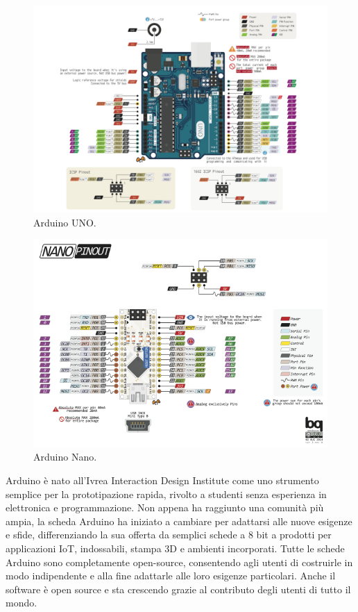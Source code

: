\documentclass[12pt,oneside,a4paper]{article}
\begin{document}
\clearpage
\begin{figure}[!htb]
    \centering
    \includegraphics[width=0.90\linewidth]{figures/arduinoUNO.png}
    \caption{Arduino UNO.}
\end{figure}

\begin{figure}[!htb]
    \centering
    \includegraphics[width=0.90\linewidth]{figures/arduinoNANO.png}
    \caption{Arduino Nano.}
\end{figure}
Arduino è nato all'Ivrea Interaction Design Institute come uno strumento semplice per la prototipazione rapida, rivolto a studenti senza esperienza in elettronica e programmazione. Non appena ha raggiunto una comunità più ampia, la scheda Arduino ha iniziato a cambiare per adattarsi alle nuove esigenze e sfide, differenziando la sua offerta da semplici schede a 8 bit a prodotti per applicazioni IoT, indossabili, stampa 3D e ambienti incorporati. Tutte le schede Arduino sono completamente open-source, consentendo agli utenti di costruirle in modo indipendente e alla fine adattarle alle loro esigenze particolari. Anche il software è open source e sta crescendo grazie al contributo degli utenti di tutto il mondo.
\end{document}
